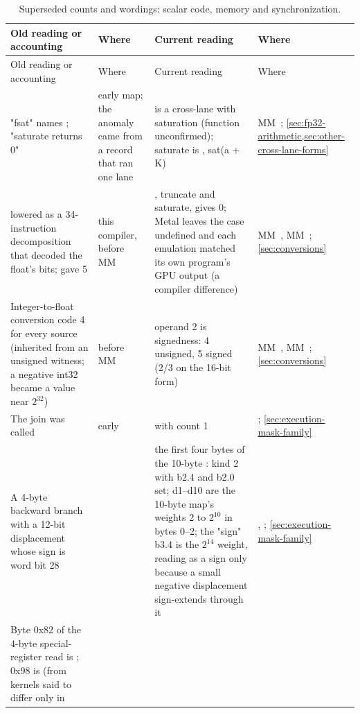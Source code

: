 \begin{xltabular}{\linewidth}{@{}>{\hsize}X>{\hsize}X>{\hsize}X>{\hsize}X@{}}
\caption{Superseded counts and wordings: scalar code, memory and synchronization.}\label{tab:acct-scalar-memory}\\
\toprule
Old reading or accounting & Where & Current reading & Where \\
\midrule
\endfirsthead
{}
\toprule
Old reading or accounting & Where & Current reading & Where \\
\midrule
\endhead
"fsat" names ; "saturate returns
0" & early map; the anomaly came from a record that ran one lane &  is a cross-lane  with saturation (function
unconfirmed); saturate is , sat(a + K) & MM~; \cref{sec:fp32-arithmetic,sec:other-cross-lane-forms} \\
 lowered as a 34-instruction decomposition that decoded
the float's bits;  gave 5 & this compiler, before MM~ & , truncate and saturate, gives 0;
Metal leaves the case undefined and each emulation matched its own
program's GPU output (a compiler difference) & MM~, MM~; \cref{sec:conversions} \\
Integer-to-float conversion code 4 for every source (inherited from an
unsigned witness; a negative int32 became a value near $2^{32}$) &  before MM~ & operand 2 is signedness: 4 unsigned, 5 signed (2/3 on the 16-bit form) & MM~, MM~; \cref{sec:conversions} \\
The join was called  & early  &  with count 1 & ; \cref{sec:execution-mask-family} \\
A 4-byte backward branch  with a 12-bit displacement
whose sign is word bit 28 &  & the first four bytes of the 10-byte : kind 2 with b2.4 and b2.0 set; d1–d10 are the 10-byte
map's weights 2 to $2^{10}$ in bytes 0–2; the "sign" b3.4
is the $2^{14}$ weight, reading as a sign only because a small negative
displacement sign-extends through it & , ; \cref{sec:execution-mask-family} \\
Byte 0x82 of the 4-byte special-register read is
; 0x98 is
 (from kernels said to differ only in

\end{xltabular}
